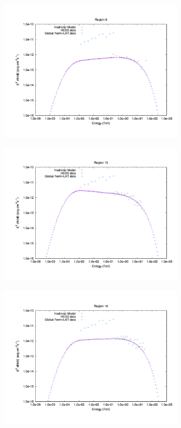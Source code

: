 \documentclass[12pt,a4paper]{article}
\begin{document}
\begin{figure}[H]
	\begin{subfigure}{0.5\textwidth}
		\centering
		\includegraphics[width=0.7\linewidth, height=0.27\textheight, angle=-90]{rxj1713_had5}
		\label{fig:rxj1713lephad5}
	\end{subfigure}
	\begin{subfigure}{0.5\textwidth}
		\centering
		\includegraphics[width=0.7\linewidth, height=0.27\textheight, angle=-90]{rxj1713_had15}
		\label{fig:rxj1713lephad15}
	\end{subfigure}
	\begin{subfigure}{0.5\textwidth}
		\centering
		\includegraphics[width=0.7\linewidth, height=0.27\textheight, angle=-90]{rxj1713_had16}

\end{subfigure}
\end{figure}
\end{document}
